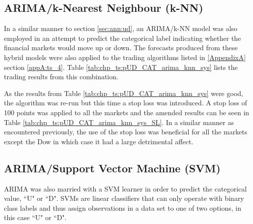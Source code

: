 
\label{todo:chp5:tab:chp_ts:pUD_CAT_arima_ann_sys}



\subsection{ARIMA/k-Nearest Neighbour (k-NN)}
In a similar manner to section \ref{sec:ann:ud}, an ARIMA/k-NN model was also employed in an attempt to predict the categorical label indicating whether the financial markets would move up or down. The forecasts produced from these hybrid models were also applied to the trading algorithms listed in \ref{AppendixA} section \ref{appA:ts_4}. Table \ref{tab:chp_ts:pUD_CAT_arima_knn_sys} lists the trading results from this combination.



As the results from Table \ref{tab:chp_ts:pUD_CAT_arima_knn_sys} were good, the algorithm was re-run but this time a stop loss was introduced. A stop loss of 100 points was applied to all the markets and the amended results can be seen in Table \ref{tab:chp_ts:pUD_CAT_arima_knn_sys_SL}. In a similar manner as encountered previously, the use of the stop loss was beneficial for all the markets except the Dow in which case it had a large detrimental affect.




\subsection{ARIMA/Support Vector Machine (SVM)}
ARIMA was also married with a SVM learner in order to predict the categorical value, \textquotedblleft U" or \textquotedblleft D". SVMs are linear classifiers that can only operate with binary class labels and thus assign observations in a data set to one of two options, in this case \textquotedblleft U" or \textquotedblleft D". 

